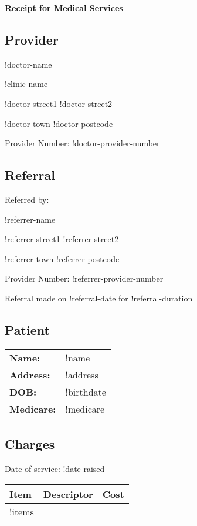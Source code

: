 \documentclass[12pt]{article}
\begin{document}
\begin{center}
{ \Large \textbf{Receipt for Medical Services} }
\end{center}

\subsection*{Provider}

!doctor-name 

!clinic-name

!doctor-street1 !doctor-street2

!doctor-town !doctor-postcode

Provider Number: !doctor-provider-number

\subsection*{Referral}

Referred by:

!referrer-name

!referrer-street1  !referrer-street2

!referrer-town !referrer-postcode

Provider Number: !referrer-provider-number

Referral made on !referral-date for !referral-duration

\subsection*{Patient}

\begin{tabular}{ll}
\textbf{Name:} & !name \\
\textbf{Address:} & !address \\
\textbf{DOB:} & !birthdate \\
\textbf{Medicare:} & !medicare \\
\end{tabular}

\subsection*{Charges}

Date of service: !date-raised 

\vspace{0.5cm}


\begin{tabular}{|l|p{12cm}|r|}
\hline
Item & Descriptor & Cost \\ \hline
!items
\hline
\end{tabular}
\end{document}
